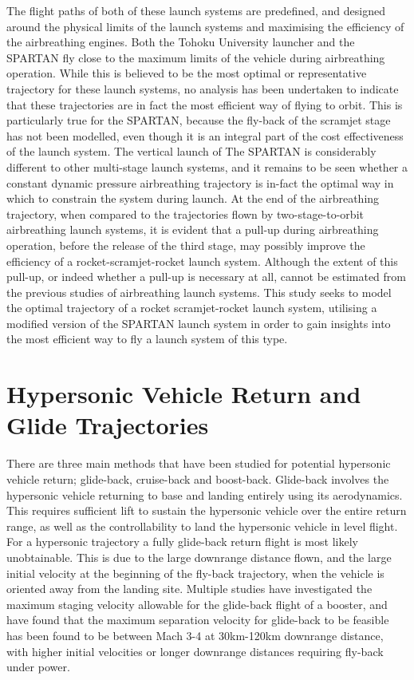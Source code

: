  The flight paths of both of these launch systems are predefined, and designed around the physical limits of the launch systems and maximising the efficiency of the airbreathing engines. Both the Tohoku University launcher and the SPARTAN fly close to the maximum limits of the vehicle during airbreathing operation.
While this is believed to be the most optimal or representative trajectory for these launch systems, no analysis has been undertaken to indicate that these trajectories are in fact the most efficient way of flying to orbit. This is particularly true for the SPARTAN, because the fly-back of the scramjet stage has not been modelled, even though it is an integral part of the cost effectiveness of the launch system. 
The vertical launch of The SPARTAN is considerably different to other multi-stage launch systems, and it remains to be seen whether a constant dynamic pressure airbreathing trajectory is in-fact the optimal way in which to constrain the system during launch. 
At the end of the airbreathing trajectory, when compared to the trajectories flown by two-stage-to-orbit airbreathing launch systems, it is evident that a pull-up during airbreathing operation, before the release of the third stage, may possibly improve the efficiency of a rocket-scramjet-rocket launch system. Although the extent of this pull-up, or indeed whether a pull-up is necessary at all, cannot be estimated from the previous studies of airbreathing launch systems.
This study seeks to model the optimal trajectory of a rocket scramjet-rocket launch system, utilising a modified version of the SPARTAN launch system in order to gain insights into the most efficient way to fly a launch system of this type. 



\section{Hypersonic Vehicle Return and Glide Trajectories}





There are three main methods that have been studied for potential hypersonic vehicle return; glide-back, cruise-back and boost-back. Glide-back involves the hypersonic vehicle returning to base and landing entirely using its aerodynamics. This requires sufficient lift to sustain the hypersonic vehicle over the entire return range, as well as the controllability to land the hypersonic vehicle in level flight. 
For a hypersonic trajectory a fully glide-back return flight is most likely unobtainable. This is due to the large downrange distance flown, and the large initial velocity at the beginning of the fly-back trajectory, when the vehicle is oriented away from the landing site. Multiple studies have investigated the maximum staging velocity allowable for the glide-back flight of a booster, and have found that the maximum separation velocity for glide-back to be feasible has been found to be between Mach 3-4 at 30km-120km downrange distance, with higher initial velocities or longer downrange distances requiring fly-back under power\cite{Hellman,Tetlow1992}.

